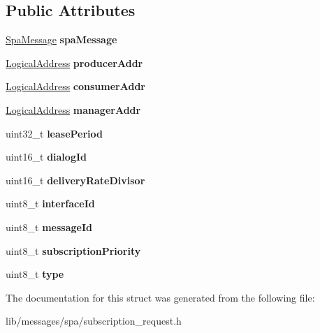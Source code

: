 \subsection*{Public Attributes}
\begin{DoxyCompactItemize}
\item 
\mbox{\label{structSubscriptionRequest_a33610286907a36d4ca8185a0208edcf8}} 
\hyperlink{structSpaMessage}{Spa\+Message} {\bfseries spa\+Message}
\item 
\mbox{\label{structSubscriptionRequest_af355bb5e7794b7c6613081982be6f72d}} 
\hyperlink{structLogicalAddress}{Logical\+Address} {\bfseries producer\+Addr}
\item 
\mbox{\label{structSubscriptionRequest_ad686e1351ba99ca2a1ca4626f58bebac}} 
\hyperlink{structLogicalAddress}{Logical\+Address} {\bfseries consumer\+Addr}
\item 
\mbox{\label{structSubscriptionRequest_a3b3f9db2899f3bec38a2d0c7ec8e6515}} 
\hyperlink{structLogicalAddress}{Logical\+Address} {\bfseries manager\+Addr}
\item 
\mbox{\label{structSubscriptionRequest_a3a7af51b8bf5ff34f09ed3599a19d0e1}} 
uint32\+\_\+t {\bfseries lease\+Period}
\item 
\mbox{\label{structSubscriptionRequest_a7e6911856acf31c1367738e230524778}} 
uint16\+\_\+t {\bfseries dialog\+Id}
\item 
\mbox{\label{structSubscriptionRequest_a85b4bd05a70308efe9dede88deef73de}} 
uint16\+\_\+t {\bfseries delivery\+Rate\+Divisor}
\item 
\mbox{\label{structSubscriptionRequest_ab170a906e69ab9dbf8213a27e96276bd}} 
uint8\+\_\+t {\bfseries interface\+Id}
\item 
\mbox{\label{structSubscriptionRequest_aee5c2ccd81b37daaad7d5aeeca12bdce}} 
uint8\+\_\+t {\bfseries message\+Id}
\item 
\mbox{\label{structSubscriptionRequest_a5b8dd2c6614db580a69c675bc9016971}} 
uint8\+\_\+t {\bfseries subscription\+Priority}
\item 
\mbox{\label{structSubscriptionRequest_a5603a9499051bd93fc94d729acb5785a}} 
uint8\+\_\+t {\bfseries type}
\end{DoxyCompactItemize}


The documentation for this struct was generated from the following file\+:\begin{DoxyCompactItemize}
\item 
lib/messages/spa/subscription\+\_\+request.\+h\end{DoxyCompactItemize}
